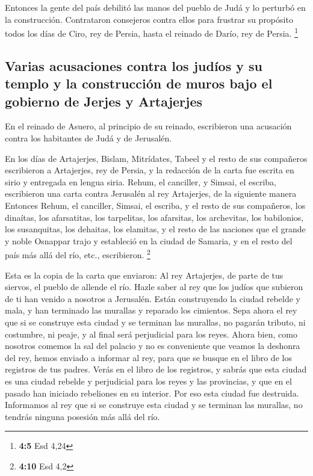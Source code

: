  Entonces la gente del país debilitó las manos del pueblo
de Judá y lo perturbó en la construcción.  Contrataron
consejeros contra ellos para frustrar su propósito todos los días de
Ciro, rey de Persia, hasta el reinado de Darío, rey de Persia.
\footnote{\textbf{4:5} Esd 4,24}

\hypertarget{varias-acusaciones-contra-los-juduxedos-y-su-templo-y-la-construcciuxf3n-de-muros-bajo-el-gobierno-de-jerjes-y-artajerjes}{%
\subsection{Varias acusaciones contra los judíos y su templo y la
construcción de muros bajo el gobierno de Jerjes y
Artajerjes}\label{varias-acusaciones-contra-los-juduxedos-y-su-templo-y-la-construcciuxf3n-de-muros-bajo-el-gobierno-de-jerjes-y-artajerjes}}

 En el reinado de Asuero, al principio de su reinado,
escribieron una acusación contra los habitantes de Judá y de Jerusalén.

 En los días de Artajerjes, Bislam, Mitrídates, Tabeel y
el resto de sus compañeros escribieron a Artajerjes, rey de Persia, y la
redacción de la carta fue escrita en sirio y entregada en lengua siria.
 Rehum, el canciller, y Simsai, el escriba, escribieron
una carta contra Jerusalén al rey Artajerjes, de la siguiente manera
 Entonces Rehum, el canciller, Simsai, el escriba, y el
resto de sus compañeros, los dinaítas, los afarsatitas, los tarpelitas,
los afarsitas, los archevitas, los babilonios, los susanquitas, los
dehaitas, los elamitas,  y el resto de las naciones que
el grande y noble Osnappar trajo y estableció en la ciudad de Samaria, y
en el resto del país más allá del río, etc., escribieron. \footnote{\textbf{4:10}
  Esd 4,2}

 Esta es la copia de la carta que enviaron: Al rey
Artajerjes, de parte de tus siervos, el pueblo de allende el río.
 Hazle saber al rey que los judíos que subieron de ti han
venido a nosotros a Jerusalén. Están construyendo la ciudad rebelde y
mala, y han terminado las murallas y reparado los cimientos.
 Sepa ahora el rey que si se construye esta ciudad y se
terminan las murallas, no pagarán tributo, ni costumbre, ni peaje, y al
final será perjudicial para los reyes.  Ahora bien, como
nosotros comemos la sal del palacio y no es conveniente que veamos la
deshonra del rey, hemos enviado a informar al rey,  para
que se busque en el libro de los registros de tus padres. Verás en el
libro de los registros, y sabrás que esta ciudad es una ciudad rebelde y
perjudicial para los reyes y las provincias, y que en el pasado han
iniciado rebeliones en su interior. Por eso esta ciudad fue destruida.
 Informamos al rey que si se construye esta ciudad y se
terminan las murallas, no tendrás ninguna posesión más allá del río.

